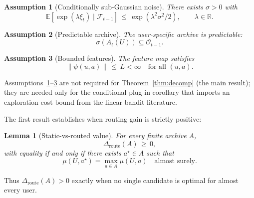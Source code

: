 \documentclass{article} %
\newtheorem{lemma}[theorem]{Lemma}
\newtheorem{assumption}{Assumption}
\providecommand{\E}{\mathbb{E}}
\begin{document}
\begin{assumption}[Conditionally sub-Gaussian noise]
\label{ass:subg}
There exists $\sigma > 0$ with
\begin{equation}
\label{eq:ass-subg}
\E\!\left[\exp(\lambda \xi_t) \mid \mathcal{F}_{t-1}\right] \,\le\, \exp(\lambda^2 \sigma^2 / 2), \qquad \lambda \in \mathbb{R}.
\end{equation}
\end{assumption}

\begin{assumption}[Predictable archive]
\label{ass:predictable}
The user-specific archive is predictable:
\begin{equation}
\label{eq:ass-pred}
\sigma(A_t(U)) \subseteq \mathcal{O}_{t-1}.
\end{equation}
\end{assumption}

\begin{assumption}[Bounded features]
\label{ass:bounded-feat}
The feature map satisfies
\begin{equation}
\label{eq:ass-feat}
\|\psi(u,a)\| \,\le\, L < \infty \quad \text{for all } (u,a).
\end{equation}
\end{assumption}

Assumptions~\ref{ass:subg}--\ref{ass:bounded-feat} are not required for Theorem~\ref{thm:decomp} (the main result); they are needed only for the conditional plug-in corollary that imports an exploration-cost bound from the linear bandit literature.

\label{sec:method-lem-het}

The first result establishes when routing gain is strictly positive:

\begin{lemma}[Static-vs-routed value]
\label{lem:hetero}
For every finite archive $A$,
\begin{equation}
\label{eq:lem-hetero}
\Delta_{\mathrm{route}}(A) \,\ge\, 0,
\end{equation}
with equality if and only if there exists $a^\star \in A$ such that
\begin{equation}
\label{eq:lem-hetero-eq}
\mu(U, a^\star) = \max_{a \in A} \mu(U,a) \quad \text{almost surely.}
\end{equation}
\end{lemma}

Thus \(\Delta_{\mathrm{route}}(A)>0\) exactly when no single candidate is
optimal for almost every user.
\end{document}
